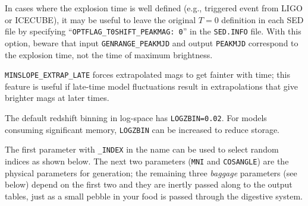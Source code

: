 \documentclass[12pt]{article}
\begin{document}
In cases where the explosion time is well defined 
(e.g., triggered event from LIGO or ICECUBE),
it may be useful to leave the original $T=0$ definition in each
SED file by specifying   ``{\tt OPTFLAG\_T0SHIFT\_PEAKMAG: 0}'' 
in the {\tt SED.INFO} file.  With this option,
beware that input {\tt GENRANGE\_PEAKMJD} and output {\tt PEAKMJD} 
correspond to the explosion time, not the time of maximum brightness.

{\tt MINSLOPE\_EXTRAP\_LATE} forces extrapolated mags to get fainter
with time; this feature is useful if late-time model fluctuations
result in extrapolations that give brighter mags at later times.

The default redshift binning in log-space has {\tt LOGZBIN=0.02}.
For models consuming significant memory, {\tt LOGZBIN} can be
increased to reduce storage.

The first parameter with {\tt \_INDEX} in the name can be used
to select random indices as shown below.
The next two parameters ({\tt MNI} and {\tt COSANGLE})
are the physical parameters for generation; the remaining three
{\it baggage} parameters (see below) depend on the first two 
and they are inertly passed along to the output tables, 
just as a small pebble in your food is passed through 
the digestive system.
\end{document}
